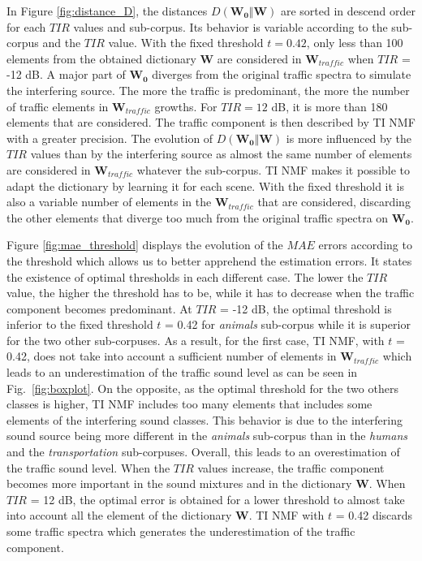 \documentclass[12pt,english,twoside]{article}
\begin{document}
In Figure \ref{fig:distance_D}, the distances $D(\mathbf{W_0}\Vert \mathbf{W})$ are sorted in descend order for each $TIR$ values and sub-corpus. Its behavior is variable according to the sub-corpus and the $TIR$ value.
With the fixed threshold $t = 0.42$, only less than 100 elements from the obtained dictionary $\mathbf{W}$ are considered in $\mathbf{W}_{traffic}$ when $TIR$ = -12 dB. A major part of $\mathbf{W_0}$ diverges from the original traffic spectra to simulate the interfering source. The more the traffic is predominant, the more the number of traffic elements in $\mathbf{W}_{traffic}$ growths. For $TIR = 12$ dB, it is more than 180 elements that are considered. The traffic component is then described by TI NMF with a greater precision. The evolution of $D(\mathbf{W_0}\Vert \mathbf{W})$ is more influenced by the $TIR$ values than by the interfering source as almost the same number of elements are considered in $\mathbf{W}_{traffic}$ whatever the sub-corpus.
TI NMF makes it possible to adapt the dictionary by learning it for each scene. With the fixed threshold it is also a variable number of elements in the $\mathbf{W}_{traffic}$ that are considered,  discarding the other elements that diverge too much from the original traffic spectra on $\mathbf{W_0}$.

Figure \ref{fig:mae_threshold} displays the evolution of the $MAE$ errors according to the threshold which allows us to better apprehend the estimation errors. It states the existence of optimal thresholds in each different case. The lower the $TIR$ value, the higher the threshold has to be, while it has to decrease when the traffic component becomes predominant.
At $TIR$ = -12 dB, the optimal threshold is inferior to the fixed threshold $t$ = 0.42 for \textit{animals} sub-corpus while it is superior for the two other sub-corpuses. As a result, for the first case, TI NMF, with $t$ = 0.42, does not take into account a sufficient number of elements in $\mathbf{W}_{traffic}$ which leads to an underestimation of the traffic sound level as can be seen in Fig.~\ref{fig:boxplot}. On the opposite, as the optimal threshold for the two others classes is higher, TI NMF includes too many elements that includes some elements of the interfering sound classes. This behavior is due to the interfering sound source being more different in the \textit{animals} sub-corpus than in the \textit{humans} and the \textit{transportation} sub-corpuses. Overall, this leads to an overestimation of the traffic sound level.
When the $TIR$ values increase, the traffic component becomes more important in the sound mixtures and in the dictionary $\mathbf{W}$. When $TIR$ = 12 dB, the optimal error is obtained for a lower threshold to almost take into account all the element of the dictionary $\mathbf{W}$. TI NMF with $t$ = 0.42 discards some traffic spectra which generates the underestimation of the traffic component.
\end{document}
